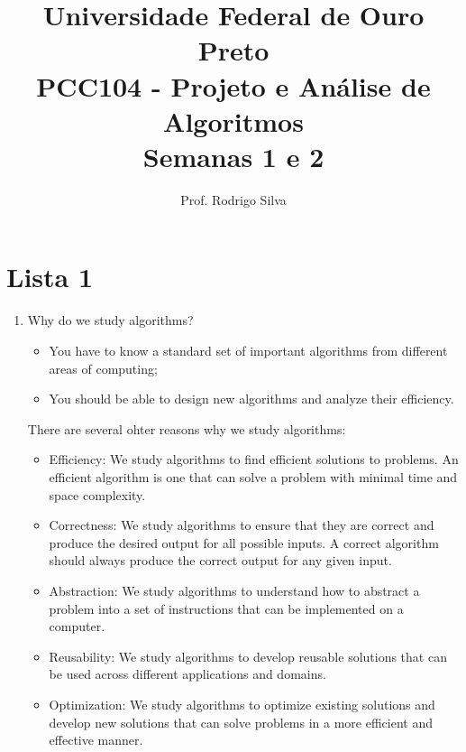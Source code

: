 \documentclass{article}
\title{\vspace{-2 cm}Universidade Federal de Ouro Preto \\ PCC104 - Projeto e Análise de Algoritmos \\ Semanas 1 e 2}
\author{Prof. Rodrigo Silva}
\begin{document}
\maketitle


\section*{Lista 1}

\begin{enumerate}
    \item Why do we study algorithms?
    
    \begin{itemize}
        \item You have to know a standard set of important algorithms from different areas of computing; 
        \item You should be able to design new algorithms and analyze their efficiency.
    \end{itemize}

    There are several ohter reasons why we study algorithms:
    
    \begin{itemize}

        \item Efficiency: We study algorithms to find efficient solutions to problems. An efficient algorithm is one that can solve a problem with minimal time and space complexity.
    
        \item Correctness: We study algorithms to ensure that they are correct and produce the desired output for all possible inputs. A correct algorithm should always produce the correct output for any given input.
    
        \item Abstraction: We study algorithms to understand how to abstract a problem into a set of instructions that can be implemented on a computer.
    
        \item Reusability: We study algorithms to develop reusable solutions that can be used across different applications and domains.
    
        \item Optimization: We study algorithms to optimize existing solutions and develop new solutions that can solve problems in a more efficient and effective manner.
    
    \end{itemize}
        


\end{enumerate}
\end{document}
